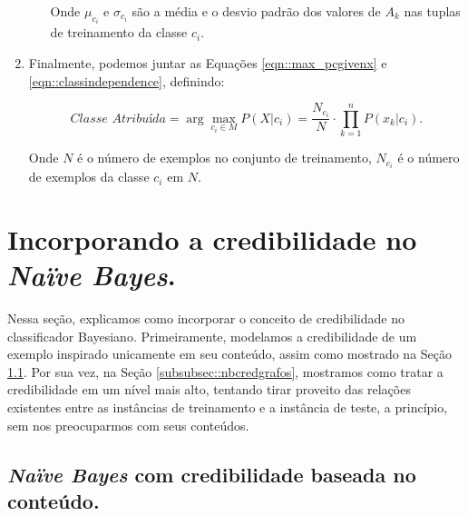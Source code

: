 \begin{enumerate}
\begin{itemize}
        Onde $\mu_{c_i}$ e $\sigma_{c_i}$ são a média e o desvio padrão dos valores de $A_k$ nas tuplas de treinamento da classe $c_i$. 

    \end{itemize}

    \item Finalmente, podemos juntar as Equações \ref{eqn::max_pcgivenx} e \ref{eqn::classindependence}, definindo:

    \begin{equation}\label{eqn::nbfinal}
    \textit{Classe Atribuída} = \arg\max_{c_i \in M}P(X|c_i) = \frac{N_{c_i}}{N} \cdot {\prod^{n}_{k=1}{P(x_k|c_i) }}.
    \end{equation}

    Onde $N$ é o número de exemplos no conjunto de treinamento, $N_{c_i}$ é o número de exemplos da classe $c_i$ em $N$.


\end{enumerate}


\section{Incorporando a credibilidade no \textit{Naïve Bayes}.}
\label{subsubsec::nb_cred}

Nessa seção, explicamos como incorporar o conceito de credibilidade no classificador Bayesiano. Primeiramente, modelamos a credibilidade de um exemplo inspirado unicamente em seu conteúdo, assim como mostrado na Seção \ref{subsubsec::nbcredconteudo}. Por sua vez, na Seção \ref{subsubsec::nbcredgrafos}, mostramos como tratar a credibilidade em um nível mais alto, tentando tirar proveito das relações existentes entre as instâncias de treinamento e a instância de teste, a princípio, sem nos preocuparmos com seus conteúdos.

\subsection{\textit{Naïve Bayes} com credibilidade baseada no conteúdo.}
\label{subsubsec::nbcredconteudo}

